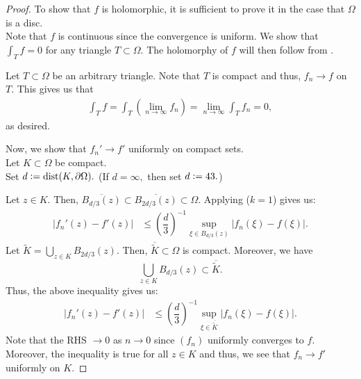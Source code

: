 \montel*\label{cor:montel2}
\begin{flushright}\hyperref[cor:montel]{\upsym}\end{flushright}
\begin{proof}
	To show that $f$ is holomorphic, it is sufficient to prove it in the case that $\Omega$ is a disc.\\
	Note that $f$ is continuous since the convergence is uniform. We show that $\displaystyle\int_T f = 0$ for any triangle $T \subset \Omega.$ The holomorphy of $f$ will then follow from .

	Let $T \subset \Omega$ be an arbitrary triangle. Note that $T$ is compact and thus, $f_n \to f$ on $T.$ This gives us that
	\begin{align*} 
		\int_T f = \int_T\left(\lim_{n\to \infty}f_n\right) = \lim_{n\to \infty}\int_T f_n = 0,
	\end{align*}
	as desired.
	
	\hrulefill
	
	Now, we show that $f_n' \to f'$ uniformly on compact sets.\\
	Let $K \subset \Omega$ be compact.\\
	Set $d \vcentcolon= \operatorname{dist}(K, \partial\Omega).$ (If $d = \infty,$ then set $d \vcentcolon= 43.$)

	Let $z \in K.$ Then, $\overline{B_{d/3}(z)} \subset \overline{B_{2d/3}(z)} \subset \Omega.$ Applying  ($k = 1$) gives us:
	\begin{align*} 
		|f_n'(z) - f'(z)| &\le \left(\dfrac{d}{3}\right)^{-1}\sup_{\xi \in B_{d/3}(z)}\left|f_n(\xi) - f(\xi)\right|.
	\end{align*}
	Let $\tilde K = \displaystyle\bigcup_{z \in K}B_{2d/3}(z).$ Then, $\overline{\tilde K} \subset \Omega$ is compact. Moreover, we have
	\begin{equation*} 
		\bigcup_{z \in K}B_{d/3}(z) \subset \overline{\tilde{K}}.
	\end{equation*} 
	Thus, the above inequality gives us:
	\begin{align*} 
		|f_n'(z) - f'(z)| &\le \left(\dfrac{d}{3}\right)^{-1}\sup_{\xi \in \overline{\tilde K}}\left|f_n(\xi) - f(\xi)\right|.
	\end{align*}
	Note that the RHS $\to 0$ as $n \to 0$ since $(f_n)$ uniformly converges to $f.$ Moreover, the inequality is true for all $z \in K$ and thus, we see that $f_n \to f'$ uniformly on $K.$
	
	\hrulefill
	

\end{proof}
